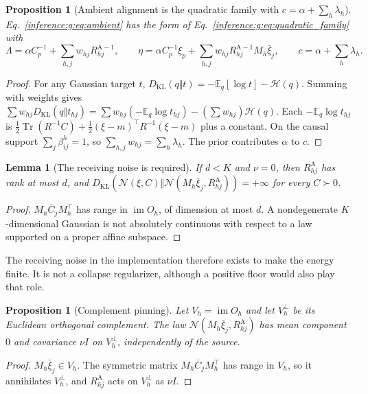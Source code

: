 \documentclass[11pt]{article}
\newtheorem{proposition}[theorem]{Proposition}
\newtheorem{lemma}[theorem]{Lemma}
\theoremstyle{definition}
\theoremstyle{remark}
\providecommand{\im}{\operatorname{im}}
\providecommand{\KL}{D_{\mathrm{KL}}}
\providecommand{\Tr}{\operatorname{Tr}}
\providecommand{\E}{\mathbb{E}}
\providecommand{\N}{\mathcal{N}}
\providecommand{\Hent}{\mathcal{H}}
\begin{document}
\begin{proposition}[Ambient alignment is the quadratic family with $c=\alpha+\sum_h\lambda_h$]
\label{inference:g:prop:ambient}
Eq.~\eqref{inference:g:eq:ambient} has the form of Eq.~\eqref{inference:g:eq:quadratic_family} with
\begin{equation}
\Lambda=\alpha C_p^{-1}+\sum_{h,j}w_{hj}R^{\mathrm A -1}_{hj},\qquad
\eta=\alpha C_p^{-1}\xi_p+\sum_{h,j}w_{hj}R^{\mathrm A -1}_{hj}M_h\bar\xi_j,\qquad
c=\alpha+\sum_h\lambda_h.
\end{equation}
\end{proposition}

\begin{proof}
For any Gaussian target $t$, $\KL(q\Vert t)=-\E_q[\log t]-\Hent(q)$. Summing with weights gives $\sum w_{hj}\KL(q\Vert t_{hj})=\sum w_{hj}(-\E_q\log t_{hj})-(\sum w_{hj})\Hent(q)$. Each $-\E_q\log t_{hj}$ is $\tfrac12\Tr(R^{-1}C)+\tfrac12(\xi-m)^\top R^{-1}(\xi-m)$ plus a constant. On the causal support $\sum_j\beta_{ij}^h=1$, so $\sum_{h,j}w_{hj}=\sum_h\lambda_h$. The prior contributes $\alpha$ to $c$.
\end{proof}

\begin{lemma}[The receiving noise is required]
\label{inference:g:lem:noise_required}
If $d<K$ and $\nu=0$, then $R^{\mathrm A}_{hj}$ has rank at most $d$, and $\KL(\N(\xi,C)\Vert\N(M_h\bar\xi_j,R^{\mathrm A}_{hj}))=+\infty$ for every $C\succ0$.
\end{lemma}

\begin{proof}
$M_h\bar C_jM_h^\top$ has range in $\im O_h$, of dimension at most $d$. A nondegenerate $K$-dimensional Gaussian is not absolutely continuous with respect to a law supported on a proper affine subspace.
\end{proof}

The receiving noise in the implementation therefore exists to make the energy finite. It is not a collapse regularizer, although a positive floor would also play that role.

\begin{proposition}[Complement pinning]
\label{inference:g:prop:pinning}
Let $V_h=\im O_h$ and let $V_h^\perp$ be its Euclidean orthogonal complement. The law $\N(M_h\bar\xi_j,R^{\mathrm A}_{hj})$ has mean component $0$ and covariance $\nu I$ on $V_h^\perp$, independently of the source.
\end{proposition}

\begin{proof}
$M_h\bar\xi_j\in V_h$. The symmetric matrix $M_h\bar C_jM_h^\top$ has range in $V_h$, so it annihilates $V_h^\perp$, and $R^{\mathrm A}_{hj}$ acts on $V_h^\perp$ as $\nu I$.
\end{proof}
\end{document}
